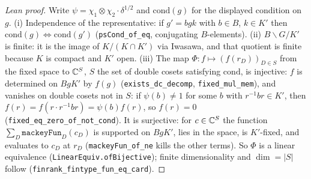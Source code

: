 \begin{proof}[Lean proof]
Write $\psi=\chi_1\otimes\chi_2\cdot\delta^{1/2}$ and $\mathrm{cond}(g)$ for the displayed condition on $g$. (i) Independence of the representative: if $g'=bgk$ with $b\in B$, $k\in K'$ then $\mathrm{cond}(g)\Leftrightarrow\mathrm{cond}(g')$ (\texttt{psCond\_of\_eq}, conjugating $B$-elements). (ii) $B\backslash G/K'$ is finite: it is the image of $K/(K\cap K')$ via Iwasawa, and that quotient is finite because $K$ is compact and $K'$ open. (iii) The map $\Phi\colon f\mapsto (f(r_D))_{D\in S}$ from the fixed space to $\mathbb{C}^S$, $S$ the set of double cosets satisfying $\mathrm{cond}$, is injective: $f$ is determined on $BgK'$ by $f(g)$ (\texttt{exists\_dc\_decomp}, \texttt{fixed\_mul\_mem}), and vanishes on double cosets not in $S$: if $\psi(b)\ne1$ for some $b$ with $r^{-1}br\in K'$, then $f(r)=f(r\cdot r^{-1}br)=\psi(b)f(r)$, so $f(r)=0$ (\texttt{fixed\_eq\_zero\_of\_not\_cond}). It is surjective: for $c\in\mathbb{C}^S$ the function $\sum_D\texttt{mackeyFun}_D(c_D)$ is supported on $BgK'$, lies in the space, is $K'$-fixed, and evaluates to $c_D$ at $r_D$ (\texttt{mackeyFun\_of\_ne} kills the other terms). So $\Phi$ is a linear equivalence (\texttt{LinearEquiv.ofBijective}); finite dimensionality and $\dim=|S|$ follow (\texttt{finrank\_fintype\_fun\_eq\_card}).
\end{proof}

